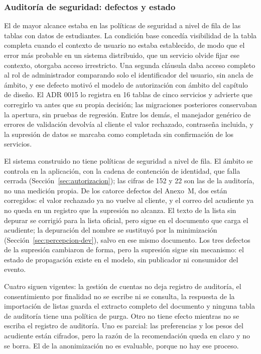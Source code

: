 \subsubsection{Auditoría de seguridad: defectos y estado}


El de mayor alcance estaba en las políticas de seguridad a nivel de fila de las tablas con datos de
estudiantes. La condición base concedía visibilidad de la tabla completa cuando el contexto de
usuario no estaba establecido, de modo que el error más probable en un sistema distribuido, que un
servicio olvide fijar ese contexto, otorgaba acceso irrestricto. Una segunda cláusula daba acceso
completo al rol de administrador comparando solo el identificador del usuario, sin ancla de ámbito,
y ese defecto motivó el modelo de autorización con ámbito del capítulo de diseño. El ADR 0015 lo
registra en 16 tablas de cinco servicios y advierte que corregirlo va antes que su propia decisión;
las migraciones posteriores conservaban la apertura, sin pruebas de regresión. Entre los demás, el
manejador genérico de errores de validación devolvía al cliente el valor rechazado, contraseña
incluida, y la supresión de datos se marcaba como completada sin confirmación de los servicios.


El sistema construido no tiene políticas de seguridad a nivel de fila. El ámbito se controla en la
aplicación, con la cadena de contención de identidad, que falla cerrada
(Sección~\ref{sec:autorizacion}); las cifras de 152 y 22 son las de la auditoría, no una medición
propia. De los catorce defectos del Anexo~M, dos están corregidos: el valor rechazado ya no vuelve
al cliente, y el correo del acudiente ya no queda en un registro que la supresión no alcanza. El
texto de la lista sin depurar se corrigió para la lista oficial, pero sigue en el documento que
carga el acudiente; la depuración del nombre se sustituyó por la minimización
(Sección~\ref{sec:percepcion-dev}), salvo en ese mismo documento. Los tres defectos de la supresión
cambiaron de forma, pero la supresión sigue sin mecanismo: el estado de propagación existe en el
modelo, sin publicador ni consumidor del evento.

Cuatro siguen vigentes: la gestión de cuentas no deja registro de auditoría, el consentimiento por
finalidad no se escribe ni se consulta, la respuesta de la importación de listas guarda el extracto
completo del documento y ninguna tabla de auditoría tiene una política de purga. Otro no tiene
efecto mientras no se escriba el registro de auditoría. Uno es parcial: las preferencias y los pesos
del acudiente están cifrados, pero la razón de la recomendación queda en claro y no se borra. El de
la anonimización no es evaluable, porque no hay ese proceso.


